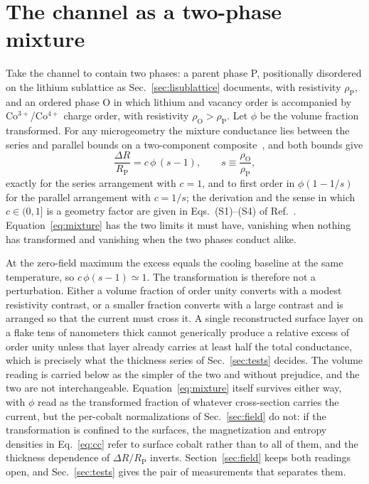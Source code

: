 \documentclass[reprint,twocolumn,prb,amsmath,amssymb,superscriptaddress,floatfix]{revtex4-2}
\begin{document}
\section{The channel as a two-phase mixture}
\label{sec:mixture}

Take the channel to contain two phases: a parent phase P, positionally disordered on the
lithium sublattice as Sec.~\ref{sec:lisublattice} documents, with resistivity
$\rho_{\mathrm{P}}$, and an ordered phase O in which
lithium and vacancy order is accompanied by Co$^{3+}$/Co$^{4+}$ charge order, with resistivity
$\rho_{\mathrm{O}}>\rho_{\mathrm{P}}$. Let $\phi$ be the volume fraction transformed. For any
microgeometry the mixture conductance lies between the series and parallel bounds on a
two-component composite~\cite{Wiener1912,Milton2002}, and both bounds give
\begin{equation}
  \frac{\Delta R}{R_{\mathrm{P}}} = c\,\phi\,(s-1),
  \qquad s \equiv \frac{\rho_{\mathrm{O}}}{\rho_{\mathrm{P}}},
  \label{eq:mixture}
\end{equation}
exactly for the series arrangement with $c=1$, and to first order in $\phi(1-1/s)$ for the
parallel arrangement with $c=1/s$; the derivation and the sense in which $c\in(0,1]$ is a
geometry factor are given in Eqs.~(S1)--(S4) of Ref.~\cite{SM}. Equation~\eqref{eq:mixture}
has the two limits it must have, vanishing when nothing has transformed and vanishing when the
two phases conduct alike.

At the zero-field maximum the excess equals the cooling baseline at the same temperature, so
$c\,\phi(s-1)\simeq1$. The transformation is therefore not a perturbation. Either a volume
fraction of order unity converts with a modest resistivity contrast, or a smaller fraction
converts with a large contrast and is arranged so that the current must cross it. A single
reconstructed surface layer on a flake tens of nanometers thick cannot generically produce a
relative excess of order unity unless that layer already carries at least half the total
conductance, which is precisely what the thickness series of Sec.~\ref{sec:tests} decides. The
volume reading is carried below as the simpler of the two and without prejudice, and the two are
not interchangeable. Equation~\eqref{eq:mixture} itself survives either way, with $\phi$ read as
the transformed fraction of whatever cross-section carries the current, but the per-cobalt
normalizations of Sec.~\ref{sec:field} do not: if the transformation is confined to the
surfaces, the magnetization and entropy densities in Eq.~\eqref{eq:cc} refer to surface cobalt
rather than to all of them, and the thickness dependence of $\Delta R/R_{\mathrm{P}}$ inverts.
Section~\ref{sec:field} keeps both readings open, and Sec.~\ref{sec:tests} gives the pair of
measurements that separates them.
\end{document}
